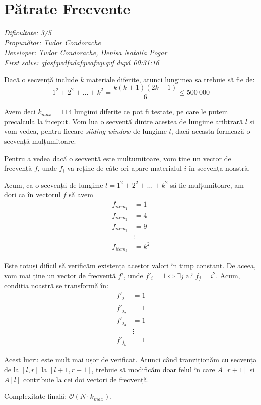 \section{Pătrate Frecvente}
\textit{Dificultate: 3/5} \\
\textit{Propunător: Tudor Condorache} \\
\textit{Developer: Tudor Condorache, Denisa Natalia Pogar} \\
\textit{First solve: qfasfqwdfadafqwafvqvqvf după 00:31:16}  \\

\begin{remark}
    Dacă o secvență include $k$ materiale diferite, atunci lungimea sa trebuie să fie de:
    \[
        1^{2} + 2^{2} + \ldots + k^{2} = \frac{k(k+1)(2k + 1)}{6} \leq 500\ 000
    \]
    
\end{remark}

Avem deci $k_{max} = 114$ lungimi diferite ce pot fi testate, pe care le putem precalcula la început. Vom lua o secvență dintre acestea de lungime aribtrară $l$ și vom vedea, pentru fiecare \textit{sliding window} de lungime $l$, dacă aceasta formează o secvență mulțumitoare.

Pentru a vedea dacă o secvență este mulțumitoare, vom ține un vector de frecvență $f$, unde $f_{i}$ va reține de câte ori apare materialul $i$ în secvența noastră.

Acum, ca o secvență de lungime $l = 1^{2} + 2^{2} + \ldots + k^{2}$ să fie mulțumitoare, am dori ca în vectorul $f$ să avem
\begin{align*}
    f_{item_{1}}   &= 1 \\
    f_{item_{2}} &= 4 \\
    f_{item_{3}} &= 9 \\
     & \vdots \\
    f_{item_{k}} &= k^{2}
\end{align*}

Este totuși dificil să verificăm existența acestor valori în timp constant. De aceea, vom mai ține un vector de frecvență $f'$, unde $f'_{i} = 1 \iff \exists j \; \text{a.î}\; f_{j} = i^{2}$. Acum, condiția noastră se transformă în:
\begin{align*}
    f'_{j_{1}}   &= 1 \\
    f'_{j_{2}} &= 1 \\
    f'_{j_{3}} &= 1 \\
    & \vdots \\
    f'_{j_{k}} &= 1
\end{align*}

Acest lucru este mult mai ușor de verificat. Atunci când tranziționăm cu secvența de la $[l, r]$ la $[l + 1, r +1]$, trebuie să modificăm doar felul în care $A[r + 1]$ și $A[l]$ contribuie la cei doi vectori de frecvență.

\medskip

Complexitate finală: $\mathcal{O}(N \cdot k_{max})$.
